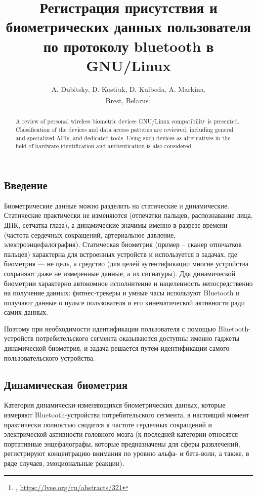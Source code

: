 \documentclass[10pt, a5paper]{article}
\begin{document}
\title{Регистрация присутствия и биометрических данных пользователя по протоколу bluetooth в GNU/Linux}
\author{A. Dubitsky, D. Kostiuk, D. Kulbeda, A. Markina,\\ Brest, Belarus\footnote{\href{alexandr.dubitsky@gmail.com}, \url{https://lvee.org/ru/abstracts/321}}}
\maketitle
\begin{abstract}
A review of personal wireless biometric devices GNU/Linux compatibility is presented. Classification of the devices and data access patterns are reviewed, including general and specialized APIs, and dedicated tools. Using such devices as alternatives in the field of hardware identification and authentication is also considered.
\end{abstract}
\subsection*{Введение}

Биометрические данные можно разделить на статические и динамические. Статические практически не изменяются (отпечатки пальцев, распознавание лица, ДНК, сетчатка глаза), а  динамические значимы именно в разрезе времени (частота сердечных сокращений, артериальное давление, электроэнцефалография). Статическая биометрия (пример -- сканер отпечатков пальцев) характерна для встроенных устройств и используется в задачах, где биометрия --- не цель, а средство (для целей аутентификации многие устройства сохраняют даже не измеренные данные, а их сигнатуры). Ддя динамической биометрии характерно автономное исполнитение и нацеленность непосредственно на получение данных: фитнес-трекеры и умные часы используют Bluetooth и получают данные о пульсе пользователя и его кинематической активности ради самих данных.

Поэтому при необходимости идентификации пользователя с помощью Bluetooth-устройств потребительского сегмента оказываются доступны  именно гаджеты динамической биометрия, и задача решается путём идентификации самого пользовательского устройства.

\subsection*{Динамическая биометрия}

Категория динамически-изменяющихся биометрических данных, которые измеряют Bluetooth-устройства потребительского сегмента, в настоящий момент практически полностью сводится к частоте сердечных сокращений и электрической активности головного мозга (к последней категории относятся портативные энцефалографы, которые предназначены для сферы развлечений, регистрируют концентрацию внимания по уровню альфа- и бета-волн, а также, в ряде случаев, эмоциональные реакции).
\end{document}
